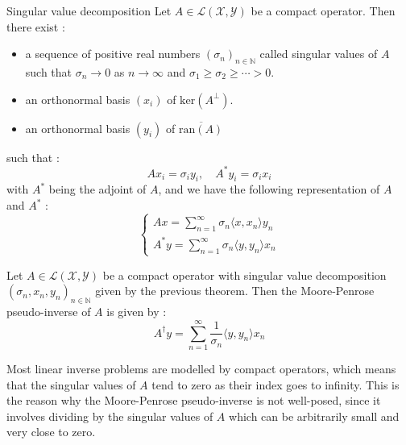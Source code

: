 \begin{theorem}{Singular value decomposition}
    Let $A \in \mathcal{L}(\mathcal{X}, \mathcal{Y})$ be a compact operator. Then there exist :
    
    \begin{itemize}
        \item a sequence of positive real numbers $(\sigma_n)_{n \in \mathbb{N}}$ called singular values of $A$ such that $\sigma_n \to 0$ as $n \to \infty$ and $\sigma_1 \geq \sigma_2 \geq \cdots > 0$.
        \item an orthonormal basis $(x_i)$ of $\text{ker}(A^\perp)$.
        \item an orthonormal basis $(y_i)$ of $\overline{\text{ran}(A)}$
    \end{itemize}
        such that :
    \begin{equation*}
        A x_i = \sigma_i y_i, \quad A^* y_i = \sigma_i x_i
    \end{equation*}
    with $A^*$ being the adjoint of $A$, and we have the following representation of $A$ and $A^*$ :
    \begin{equation*}
        \begin{cases}
            \displaystyle A x = \sum_{n=1}^\infty \sigma_n \langle x, x_n \rangle y_n \\
            \displaystyle A^* y = \sum_{n=1}^\infty \sigma_n \langle y, y_n \rangle x_n
        \end{cases}
    \end{equation*}
\end{theorem}

\begin{theorem}
    Let $A \in \mathcal{L}(\mathcal{X}, \mathcal{Y})$ be a compact operator with singular value decomposition $(\sigma_n, x_n, y_n)_{n \in \mathbb{N}}$ given by the previous theorem. 
    Then the Moore-Penrose pseudo-inverse of $A$ is given by :
    \begin{equation*}
        A^\dagger y = \sum_{n=1}^\infty \frac{1}{\sigma_n} \langle y, y_n \rangle x_n
    \end{equation*}
\end{theorem}

Most linear inverse problems are modelled by compact operators, which means that the singular values of $A$ tend to zero as their index goes to infinity. This is the reason why the Moore-Penrose pseudo-inverse is not well-posed, since it involves dividing by the singular values of $A$ which can be arbitrarily small and very close to zero.

